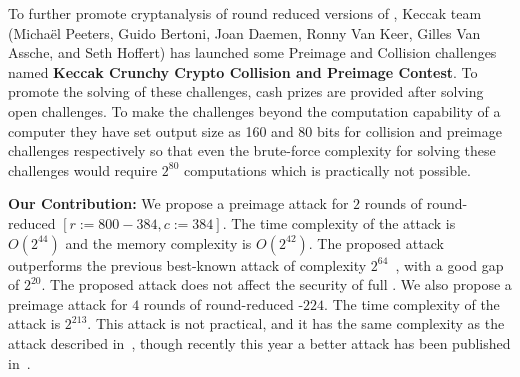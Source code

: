 \newpage
To further promote cryptanalysis of round reduced versions of \KECCAK{}, Keccak team (Michaël Peeters, Guido Bertoni, Joan Daemen, Ronny Van Keer, Gilles Van Assche, and Seth Hoffert) has launched some Preimage and Collision challenges named \textbf{Keccak Crunchy Crypto Collision and Preimage Contest}. To promote the solving of these challenges, cash prizes are provided after solving open challenges. To make the challenges beyond the computation capability of a computer they have set output size as 160 and 80 bits for collision and preimage challenges respectively so that even the brute-force complexity for solving these challenges would require $2^{80}$ computations which is practically not possible.
\newline

\textbf{Our Contribution:} We propose a preimage attack for $2$ rounds of round-reduced \KECCAK{}$[r:=800-384, c:=384]$. The time complexity of the attack is $O(2^{44})$ and the memory complexity is $O(2^{42})$. The proposed attack outperforms the previous best-known attack of complexity $2^{64}$~\cite{guo2016linear}, with a good gap of $2^{20}$. The proposed attack does not affect the security of full \KECCAK{}. We also propose a preimage attack for $4$ rounds of round-reduced \KECCAK-$224$. The time complexity of the attack is $2^{213}$. This attack is not practical, and it has the same complexity as the attack described in~\cite{guo2016linear}, though recently this year a better attack has been published in~\cite{lipreimage}.

